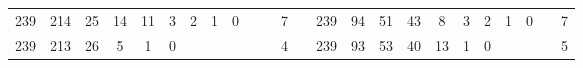 {\begin{tabular}{cccccccccccclccccccccccc}
239                                                & 214                                                & 25                                               & 14                                               & 11                                               & 3                                                & 2                                               & 1                                               & 0                                               &                                                 &                                                 & 7                                                &                          & 239                                                & 94                                                 & 51                                               & 43                                               & 8                                               & 3                                               & 2                                               & 1                                               & 0                                               &                                                 & 7                                                \\
239                                                & 213                                                & 26                                               & 5                                                & 1                                                & 0                                                &                                                 &                                                 &                                                 &                                                 &                                                 & 4                                                &                          & 239                                                & 93                                                 & 53                                               & 40                                               & 13                                              & 1                                               & 0                                               &                                                 &                                                 &                                                 & 5                                                \\

\end{tabular}}
